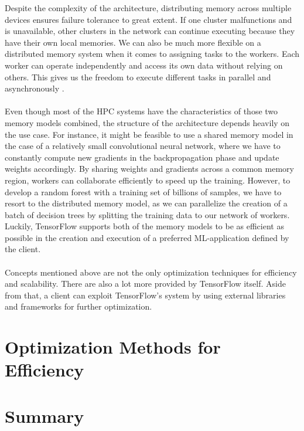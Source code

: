 \documentclass[ieeetran]{article}
\begin{document}
\hspace{-0.52cm}Despite the complexity of the architecture, distributing memory across multiple devices ensures failure tolerance to great extent. If one cluster malfunctions and is unavailable, other clusters in the network can continue executing because they have their own local memories. We can also be much more flexible on a distributed memory system when it comes to assigning tasks to the workers. Each worker can operate independently and access its own data without relying on others. This gives us the freedom to execute different tasks in parallel and asynchronously \cite{second} \cite{third}.
\\ \\Even though most of the HPC systems have the characteristics of those two memory models combined, the structure of the architecture depends heavily on the use case. For instance, it might be feasible to use a shared memory model in the case of a relatively small convolutional neural network, where we have to constantly compute new gradients in the backpropagation phase and update weights accordingly. By sharing weights and gradients across a common memory region, workers can collaborate efficiently to speed up the training. However, to develop a random forest with a training set of billions of samples, we have to resort to the distributed memory model, as we can parallelize the creation of a batch of decision trees by splitting the training data to our network of workers. Luckily, TensorFlow supports both of the memory models to be as efficient as possible in the creation and execution of a preferred ML-application defined by the client. 
\\ \\Concepts mentioned above are not the only optimization techniques for efficiency and scalability. There are also a lot more provided by TensorFlow itself. Aside from that, a client can exploit TensorFlow's system by using external libraries and frameworks for further optimization. 


\section{Optimization Methods for Efficiency} %
\label{sec:more_optimization_methods_for_efficiency}



\section{Summary} %
\label{sec:summary}
\end{document}
